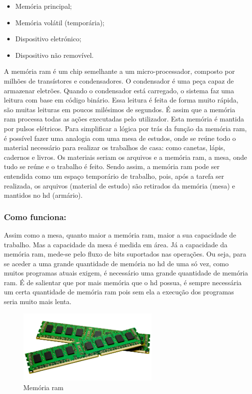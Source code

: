 \documentclass[a4paper]{report}
\begin{document}
\begin{itemize}
\item Memória principal;
\item Memória volátil (temporária);
\item Dispositivo eletrónico;
\item Dispositivo não removível.
\end{itemize}

A memória \ac{ram} é um chip semelhante a um micro-processador, composto por milhões de transístores e condensadores. O condensador é uma peça capaz de armazenar eletrões. Quando o condensador está carregado, o sistema faz uma leitura com base em código binário. Essa leitura é feita de forma muito rápida, são muitas leituras em poucos milésimos de segundos. É assim que a memória \ac{ram} processa todas as ações executadas pelo utilizador. Esta memória é mantida por pulsos elétricos. 
Para simplificar a lógica por trás da função da memória \ac{ram}, é possível fazer uma analogia com uma mesa de estudos, onde se reúne todo o material necessário para realizar os trabalhos de casa: como canetas, lápis, cadernos e livros. Os materiais seriam os arquivos e a memória \ac{ram}, a mesa, onde tudo se reúne e o trabalho é feito.
Sendo assim, a memória \ac{ram} pode ser entendida como um espaço temporário de trabalho, pois, após a tarefa ser realizada, os arquivos (material de estudo) são retirados da memória (mesa) e mantidos no \ac{hd} (armário).
\subsubsection{Como funciona:}
Assim como a mesa, quanto maior a memória \ac{ram}, maior a sua capacidade de trabalho. Mas a capacidade da mesa é medida em área. Já a capacidade da memória \ac{ram}, mede-se pelo fluxo de bits suportados nas operações.
Ou seja, para se aceder a uma grande quantidade de memória no \ac{hd} de uma só vez, como muitos programas atuais exigem, é necessário uma grande quantidade de memória \ac{ram}. É de salientar que por mais memória que o \ac{hd} possua, é sempre necessária um certa quantidade de memória \ac{ram} pois sem ela a execução dos programas seria muito mais lenta.

\begin{figure}[H]
\center
\includegraphics[width=7cm]{Imagens/ram.png}
\caption{Memória \ac{ram}}
\end{figure}
\end{document}
